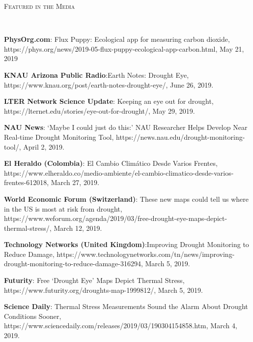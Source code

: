 \documentclass[10pt]{article}
\newenvironment{changemargin}[2]{%
  \begin{list}{}{%
 \setlength{\topsep}{0pt}%
 \setlength{\leftmargin}{#1}%
 \setlength{\rightmargin}{#2}%
 \setlength{\listparindent}{\parindent}%
 \setlength{\itemindent}{\parindent}%
 \setlength{\parsep}{\parskip}%
  }%
  \item[]}{\end{list}
}
\newcommand{\lineover}{
  \begin{changemargin}{-0.05in}{-0.05in}
  \vspace*{-8pt}
  \hrulefill \\
  \vspace*{-2pt}
  \end{changemargin}
}
\newcommand{\header}[1]{
  \begin{changemargin}{-0.5in}{-0.5in}
  \scshape{#1}\\
  \lineover
  \end{changemargin}
}
\newenvironment{body} {
  \vspace*{-2pt}
  \begin{changemargin}{-0.5in}{-0.5in}
}
{\end{changemargin}
}
\begin{document}
\medskip


\header{Featured in the Media}

\begin{body}
\textbf{PhysOrg.com}: Flux Puppy: Ecological app for measuring carbon dioxide, https://phys.org/news/2019-05-flux-puppy-ecological-app-carbon.html, May 21, 2019 \\
  \medskip
  
  \textbf{KNAU Arizona Public Radio}:Earth Notes: Drought Eye, https://www.knau.org/post/earth-notes-drought-eye/, June 26, 2019.\\
  \medskip

  \textbf{LTER Network Science Update}: Keeping an eye out for drought, https://lternet.edu/stories/eye-out-for-drought/, May 29, 2019.\\
  \medskip

  \textbf{NAU News}: ‘Maybe I could just do this:’ NAU Researcher Helps Develop Near Real-time Drought Monitoring Tool, https://news.nau.edu/drought-monitoring-tool/, April 2, 2019.\\
  \medskip

  \textbf{El Heraldo (Colombia)}: El Cambio Climático Desde Varios Frentes, https://www.elheraldo.co/medio-ambiente/el-cambio-climatico-desde-varios-frentes-612018, March 27, 2019.\\ \medskip


 \textbf{World Economic Forum (Switzerland)}: These new maps could tell us where in the US is most at risk from drought, https://www.weforum.org/agenda/2019/03/free-drought-eye-maps-depict-thermal-stress/, March 12, 2019.\\
  \medskip

\textbf{Technology Networks (United Kingdom)}:Improving Drought Monitoring to Reduce Damage, https://www.technologynetworks.com/tn/news/improving-drought-monitoring-to-reduce-damage-316294, March 5, 2019.\\
  \medskip

  \textbf{Futurity}: Free ‘Drought Eye’ Maps Depict Thermal Stress, https://www.futurity.org/droughts-map-1999812/, March 5, 2019.\\
  \medskip

  \textbf{Science Daily}: Thermal Stress Measurements Sound the Alarm About Drought Conditions Sooner, https://www.sciencedaily.com/releases/2019/03/190304154858.htm, March 4, 2019.\\
  \medskip
  

\end{body}
\end{document}
